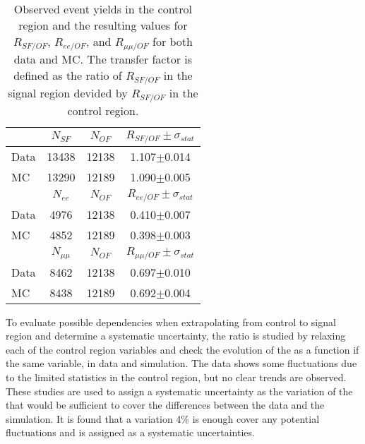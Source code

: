 \begin{table}[ht!]
\def\arraystretch{1.2}
 \caption{Observed event yields in the control region and the resulting values for $R_{SF/OF}$, $R_{ee/OF}$, and $R_{\mu\mu/OF}$ for both data and MC. 
The transfer factor is defined as the ratio of $R_{SF/OF}$ in the signal region devided by $R_{SF/OF}$ in the control region.}
  \label{tab:rSFOF}
    \begin{center}
        \begin{tabular}{ l c c c}
        \hline \hline
        & $N_{SF}$ & $N_{OF}$ & $ R_{SF/OF} \pm \sigma_{stat}$  \\    
        \hline
         Data & 13438 & 12138 & 1.107$\pm$0.014\\
         MC   & 13290 & 12189 & 1.090$\pm$0.005\\ 
        \hline
         & $N_{ee}$ & $N_{OF}$ & $ R_{ee/OF} \pm \sigma_{stat}$ \\    
        \hline
         Data & 4976 & 12138 & 0.410$\pm$0.007 \\
         MC   & 4852 & 12189 & 0.398$\pm$0.003 \\
        \hline
         & $N_{\mu\mu}$ & $N_{OF}$ & $ R_{\mu\mu/OF} \pm \sigma_{stat}$\\    
        \hline
         Data & 8462 & 12138 & 0.697$\pm$0.010 \\
         MC   & 8438 & 12189 & 0.692$\pm$0.004 \\ \hline\hline
\end{tabular}
\end{center}
\end{table}                                                                                                                                                                    


To evaluate possible dependencies when extrapolating from control to signal region and determine a systematic uncertainty, the ratio \Rsfof is studied by relaxing each of the control region variables and check the evolution of the \Rsfof as a function if the same variable, in data and simulation.  
The data shows some fluctuations due to the limited statistics in the control region, but no clear trends are observed.
These studies are used to assign a systematic uncertainty as the variation of the \Rsfof that would be sufficient to cover the differences between the data and the simulation. 
It is found that a variation 4\% is enough cover any potential fluctuations and is assigned as a systematic uncertainties. 

